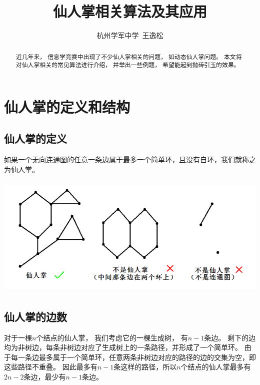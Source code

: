 \documentclass{noithesis}
\begin{document}
\setcounter{page}{129}


\title{仙人掌相关算法及其应用}
\author{杭州学军中学\ 王逸松}

\maketitle

\begin{abstract}
近几年来，
信息学竞赛中出现了不少仙人掌相关的问题，
如动态仙人掌问题。
本文将对仙人掌相关的常见算法进行介绍，
并举出一些例题，
希望能起到抛砖引玉的效果。
\end{abstract}





\section{仙人掌的定义和结构}

\subsection{仙人掌的定义}

如果一个无向连通图的任意一条边属于最多一个简单环，且没有自环，我们就称之为仙人掌。

\includegraphics[width=400pt,height=166pt]{images/what-is-cactus.png}

\subsection{仙人掌的边数}

对于一棵$n$个结点的仙人掌，
我们考虑它的一棵生成树，
有$n - 1$条边。
剩下的边均为非树边，每条非树边对应了生成树上的一条路径，并形成了一个简单环。
由于每一条边最多属于一个简单环，任意两条非树边对应的路径的边的交集为空，即这些路径不重叠。
因此最多有$n - 1$条这样的路径，所以$n$个结点的仙人掌最多有$2 n - 2$条边，最少有$n - 1$条边。
\end{document}
